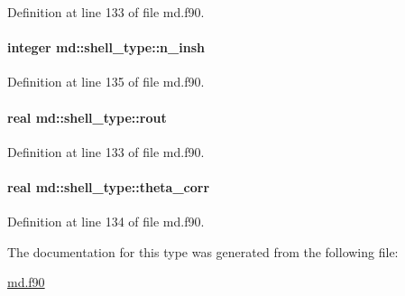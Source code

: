Definition at line 133 of file md.\-f90.

\hypertarget{structmd_1_1shell__type_a00c2da5a563e84b368a020bc8b11f835}{
\paragraph[{n\-\_\-insh}]{\setlength{\rightskip}{0pt plus 5cm}integer md\-::shell\-\_\-type\-::n\-\_\-insh}}\label{structmd_1_1shell__type_a00c2da5a563e84b368a020bc8b11f835}


Definition at line 135 of file md.\-f90.

\hypertarget{structmd_1_1shell__type_a16f41defd8b2f789f7ce155b413a3ef6}{
\paragraph[{rout}]{\setlength{\rightskip}{0pt plus 5cm}real md\-::shell\-\_\-type\-::rout}}\label{structmd_1_1shell__type_a16f41defd8b2f789f7ce155b413a3ef6}


Definition at line 133 of file md.\-f90.

\hypertarget{structmd_1_1shell__type_a9af95ecc7415730d5696ff61a2275081}{
\paragraph[{theta\-\_\-corr}]{\setlength{\rightskip}{0pt plus 5cm}real md\-::shell\-\_\-type\-::theta\-\_\-corr}}\label{structmd_1_1shell__type_a9af95ecc7415730d5696ff61a2275081}


Definition at line 134 of file md.\-f90.



The documentation for this type was generated from the following file\-:\begin{DoxyCompactItemize}
\item 
\hyperlink{md_8f90}{md.\-f90}\end{DoxyCompactItemize}
